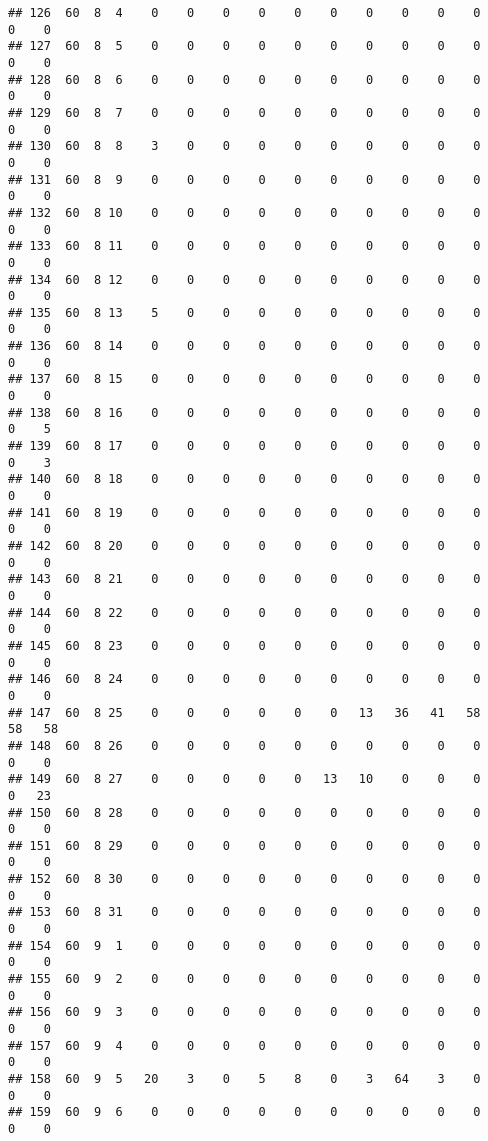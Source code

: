 \documentclass[]{article}
\begin{document}
\begin{verbatim}
## 126  60  8  4    0    0    0    0    0    0    0    0    0    0    0    0
## 127  60  8  5    0    0    0    0    0    0    0    0    0    0    0    0
## 128  60  8  6    0    0    0    0    0    0    0    0    0    0    0    0
## 129  60  8  7    0    0    0    0    0    0    0    0    0    0    0    0
## 130  60  8  8    3    0    0    0    0    0    0    0    0    0    0    0
## 131  60  8  9    0    0    0    0    0    0    0    0    0    0    0    0
## 132  60  8 10    0    0    0    0    0    0    0    0    0    0    0    0
## 133  60  8 11    0    0    0    0    0    0    0    0    0    0    0    0
## 134  60  8 12    0    0    0    0    0    0    0    0    0    0    0    0
## 135  60  8 13    5    0    0    0    0    0    0    0    0    0    0    0
## 136  60  8 14    0    0    0    0    0    0    0    0    0    0    0    0
## 137  60  8 15    0    0    0    0    0    0    0    0    0    0    0    0
## 138  60  8 16    0    0    0    0    0    0    0    0    0    0    0    5
## 139  60  8 17    0    0    0    0    0    0    0    0    0    0    0    3
## 140  60  8 18    0    0    0    0    0    0    0    0    0    0    0    0
## 141  60  8 19    0    0    0    0    0    0    0    0    0    0    0    0
## 142  60  8 20    0    0    0    0    0    0    0    0    0    0    0    0
## 143  60  8 21    0    0    0    0    0    0    0    0    0    0    0    0
## 144  60  8 22    0    0    0    0    0    0    0    0    0    0    0    0
## 145  60  8 23    0    0    0    0    0    0    0    0    0    0    0    0
## 146  60  8 24    0    0    0    0    0    0    0    0    0    0    0    0
## 147  60  8 25    0    0    0    0    0    0   13   36   41   58   58   58
## 148  60  8 26    0    0    0    0    0    0    0    0    0    0    0    0
## 149  60  8 27    0    0    0    0    0   13   10    0    0    0    0   23
## 150  60  8 28    0    0    0    0    0    0    0    0    0    0    0    0
## 151  60  8 29    0    0    0    0    0    0    0    0    0    0    0    0
## 152  60  8 30    0    0    0    0    0    0    0    0    0    0    0    0
## 153  60  8 31    0    0    0    0    0    0    0    0    0    0    0    0
## 154  60  9  1    0    0    0    0    0    0    0    0    0    0    0    0
## 155  60  9  2    0    0    0    0    0    0    0    0    0    0    0    0
## 156  60  9  3    0    0    0    0    0    0    0    0    0    0    0    0
## 157  60  9  4    0    0    0    0    0    0    0    0    0    0    0    0
## 158  60  9  5   20    3    0    5    8    0    3   64    3    0    0    0
## 159  60  9  6    0    0    0    0    0    0    0    0    0    0    0    0

\end{verbatim}
\end{document}
